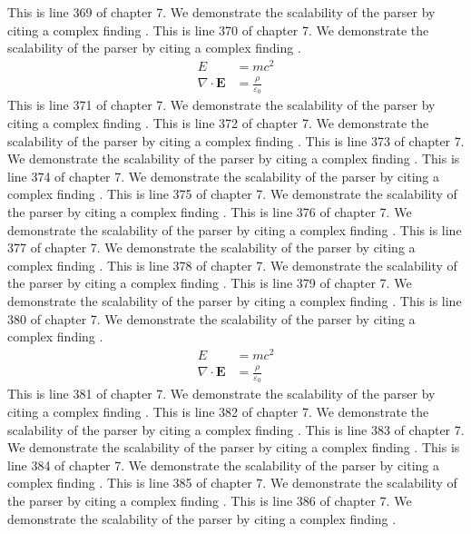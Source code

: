 This is line 369 of chapter 7. We demonstrate the scalability of the parser by citing a complex finding \cite{ref7_369}.
This is line 370 of chapter 7. We demonstrate the scalability of the parser by citing a complex finding \cite{ref7_370}.
\begin{align*}
  E &= mc^2 \\
  \nabla \cdot \mathbf{E} &= \frac{\rho}{\varepsilon_0}
\end{align*}
This is line 371 of chapter 7. We demonstrate the scalability of the parser by citing a complex finding \cite{ref7_371}.
This is line 372 of chapter 7. We demonstrate the scalability of the parser by citing a complex finding \cite{ref7_372}.
This is line 373 of chapter 7. We demonstrate the scalability of the parser by citing a complex finding \cite{ref7_373}.
This is line 374 of chapter 7. We demonstrate the scalability of the parser by citing a complex finding \cite{ref7_374}.
This is line 375 of chapter 7. We demonstrate the scalability of the parser by citing a complex finding \cite{ref7_375}.
This is line 376 of chapter 7. We demonstrate the scalability of the parser by citing a complex finding \cite{ref7_376}.
This is line 377 of chapter 7. We demonstrate the scalability of the parser by citing a complex finding \cite{ref7_377}.
This is line 378 of chapter 7. We demonstrate the scalability of the parser by citing a complex finding \cite{ref7_378}.
This is line 379 of chapter 7. We demonstrate the scalability of the parser by citing a complex finding \cite{ref7_379}.
This is line 380 of chapter 7. We demonstrate the scalability of the parser by citing a complex finding \cite{ref7_380}.
\begin{align*}
  E &= mc^2 \\
  \nabla \cdot \mathbf{E} &= \frac{\rho}{\varepsilon_0}
\end{align*}
This is line 381 of chapter 7. We demonstrate the scalability of the parser by citing a complex finding \cite{ref7_381}.
This is line 382 of chapter 7. We demonstrate the scalability of the parser by citing a complex finding \cite{ref7_382}.
This is line 383 of chapter 7. We demonstrate the scalability of the parser by citing a complex finding \cite{ref7_383}.
This is line 384 of chapter 7. We demonstrate the scalability of the parser by citing a complex finding \cite{ref7_384}.
This is line 385 of chapter 7. We demonstrate the scalability of the parser by citing a complex finding \cite{ref7_385}.
This is line 386 of chapter 7. We demonstrate the scalability of the parser by citing a complex finding \cite{ref7_386}.
